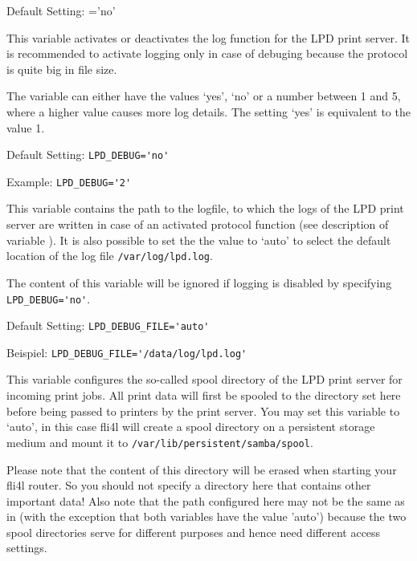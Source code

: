   Default Setting: ='no'


\begin{description}


  This variable activates or deactivates the log function for the
  LPD print server. It is recommended to activate logging only in
  case of debuging because the protocol is quite big in file size.

  The variable can either have the values `yes', `no' or a number
  between 1 and 5, where a higher value causes more log details.
  The setting `yes' is equivalent to the value 1.

  Default Setting: \verb+LPD_DEBUG='no'+

  Example: \verb+LPD_DEBUG='2'+


  This variable contains the path to the logfile, to which the logs
  of the LPD print server are written in case of an activated protocol
  function (see description of variable ).
  It is also possible to set the the value to `auto' to select the
  default location of the log file \texttt{/var/log/lpd.log}.

  The content of this variable will be ignored if logging is disabled
  by specifying \verb+LPD_DEBUG='no'+.

  Default Setting: \verb+LPD_DEBUG_FILE='auto'+

  Beispiel: \verb+LPD_DEBUG_FILE='/data/log/lpd.log'+


  This variable configures the so-called spool directory of the LPD print
  server for incoming print jobs. All print data will first be spooled to
  the directory set here before being passed to printers by the print server.
  You may set this variable to `auto', in this case fli4l will create a spool
  directory on a persistent storage medium and mount it to
  \texttt{/var/lib/persistent/samba/spool}.

  Please note that the content of this directory will be erased when starting
  your fli4l router. So you should not specify a directory here that contains
  other important data! Also note that the path configured here may not be the
  same as in  (with the exception that both variables
  have the value 'auto') because the two spool directories serve for different
  purposes and hence need different access settings.


\end{description}
